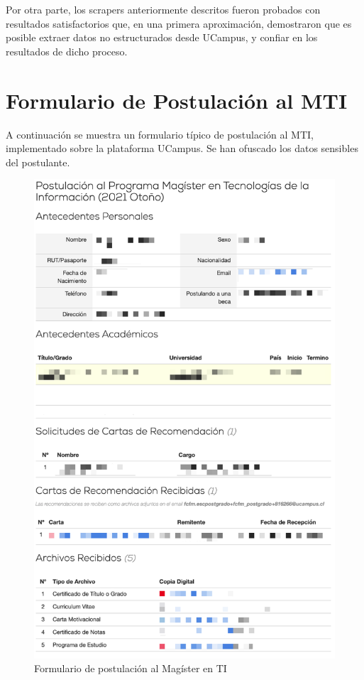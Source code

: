 Por otra parte, los scrapers anteriormente descritos fueron probados con
resultados satisfactorios que, en una primera aproximación, demostraron que es
posible extraer datos no estructurados desde UCampus, y confiar en los
resultados de dicho proceso. 

\section{Formulario de Postulación al MTI}

A continuación se muestra un formulario típico de postulación al MTI,
implementado sobre la plataforma UCampus. Se han ofuscado los datos sensibles
del postulante.

\begin{figure}[!ht]
    \begin{center}
        \includegraphics[scale=0.3]{imagenes/01-formulario-postulacion.png}
    \end{center}
    \caption{Formulario de postulación al Magíster en TI}
    \label{formulario-postulacion}
\end{figure}

